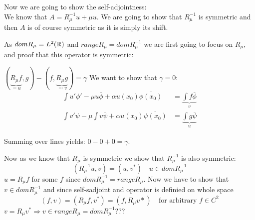 Now we are going to show the self-adjointness: \\
We know that $A = R_{\mu}^{-1}u + \mu u$. We are going to show that $R_{\mu}^{-1}$ is symmetric and then $A$ is of course symmetric as it is simply its shift.

As $dom R_{\mu} = L^{2}(\mathbb{R})$ and $range R_{\mu} = dom R_{\mu}^{-1}$ we are first going to focus on $R_{\mu}$, and proof that this operator is symmetric:

$(\underbrace{R_{\mu} f}_{= u}, g ) - (f , \underbrace{R_{\mu} g}_{\eqqcolon v} ) = \gamma$ We want to show that $\gamma = 0$:
\begin{align*}
	\int u' \phi' - \mu u \overline{\phi} + \alpha u(x_{0})\overline{\phi(x_{0})} &= \underbrace{\int f \overline{\phi} }_{v} \\
	\int v' \psi - \mu \int v \overline{\psi} + \alpha u(x_{0}) \overline{\psi(x_{0})} & = \underbrace{\int g \overline{\psi} }_{u} 
\end{align*}

Summing over lines yields: $ 0 - 0 + 0 = \gamma$.

Now as we know that $R_{\mu}$ is symmetric we show that $R_{\mu}^{-1}$ is also symmetric:
	\[ (R_{\mu}^{-1} u , v) = (u, v^{*}) \quad u \in dom R_{\mu}^{-1} \]
$u = R_{\mu} f$ for some $f$ since $dom R_{\mu}^{-1} =range R_{\mu}$. Now we have to show that $v \in dom R^{-1}_{\mu}$ and since self-sadjoint and operator is definied on whole space
	\[ (f , v) = (R_{\mu} f, v^{*}) = (f , R_{\mu} v*) \quad \text{for arbitrary } f \in C^{2} \]
$v = R_{\mu} v^{*} \Rightarrow v \in range R_{\mu} = dom R_{\mu}^{-1}$???